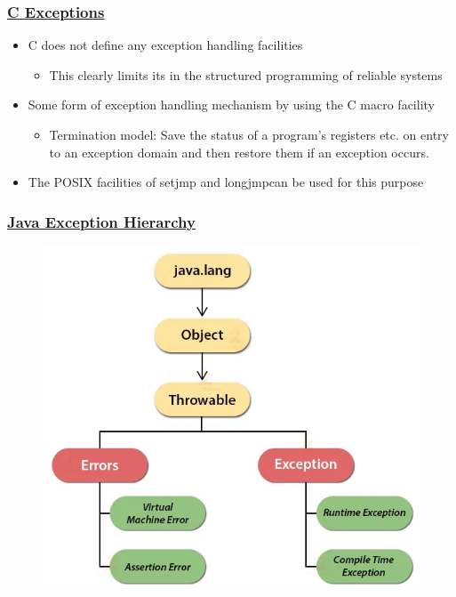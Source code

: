 \begin{frame}[fragile]
    \frametitle{\href{https://www.cs.york.ac.uk/rts/books/RTSbookThirdEdition/chap6.pdf}{C Exceptions}}

    \begin{itemize}
        \item C does not define any exception handling facilities
        \begin{itemize}
            \item This  clearly  limits  its  in  the  structured  programming  of  reliable systems
        \end{itemize}
        \item Some form of exception handling mechanism by using the C macro facility
        \begin{itemize}
            \item Termination  model: Save  the status of a program's registers etc. on entry to an exception domain and then restore them if an exception occurs.
        \end{itemize}
        \item The POSIX facilities of setjmp and longjmpcan be used for this purpose
    \end{itemize}

\end{frame}
\begin{frame}[fragile]
    \frametitle{\href{https://i0.wp.com/techvidvan.com/tutorials/wp-content/uploads/sites/2/2020/04/java-exception-hierarchy.jpg}{Java Exception Hierarchy}}
    \begin{figure}
    \includegraphics[width=0.5\linewidth]{figs/java-exception-hierarchy.png}
    \end{figure}

\end{frame}

